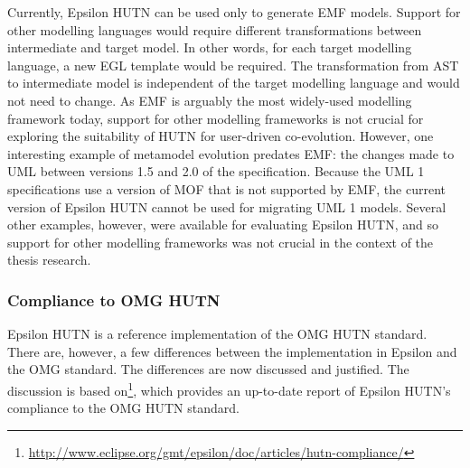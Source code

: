 Currently, Epsilon HUTN can be used only to generate EMF models. Support for other modelling languages would require different transformations between intermediate and target model. In other words, for each target modelling language, a new EGL template would be required. The transformation from AST to intermediate model is independent of the target modelling language and would not need to change. As EMF is arguably the most widely-used modelling framework today, support for other modelling frameworks is not crucial for exploring the suitability of HUTN for user-driven co-evolution. However, one interesting example of metamodel evolution predates EMF: the changes made to UML between versions 1.5 and 2.0 of the specification. Because the UML 1 specifications use a version of MOF that is not supported by EMF, the current version of Epsilon HUTN cannot be used for migrating UML 1 models. Several other examples, however, were available for evaluating Epsilon HUTN, and so support for other modelling frameworks was not crucial in the context of the thesis research.

\subsubsection{Compliance to OMG HUTN}
Epsilon HUTN is a reference implementation of the OMG HUTN standard. There are, however, a few differences between the implementation in Epsilon and the OMG standard. The differences are now discussed and justified. The discussion is based on\footnote{\url{http://www.eclipse.org/gmt/epsilon/doc/articles/hutn-compliance/}}, which provides an up-to-date report of Epsilon HUTN's compliance to the OMG HUTN standard.

